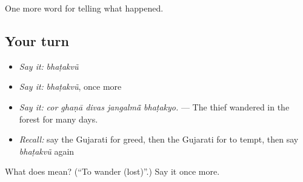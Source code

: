 \begin{grammarlens}[title={What you've built}]
One more word for telling what happened.
\end{grammarlens}

\subsection*{Your turn}
\begin{itemize}
\raggedright
  \item \emph{Say it:} \emph{bhaṭakvũ}
  \item \emph{Say it:} \emph{bhaṭakvũ}, once more
  \item \emph{Say it:} \emph{cor ghaṇā divas jangalmā̃ bhaṭakyo.} — The thief wandered in the forest for many days.
  \item \emph{Recall:} say the Gujarati for greed, then the Gujarati for to tempt, then say \emph{bhaṭakvũ} again
\end{itemize}

\begin{tcolorbox}[breakable,colback=teal!4,colframe=teal!35!black,title={Before you move on}]
What does  mean? (\textquotedblleft{}To wander (lost)\textquotedblright{}.) Say it once more.
\end{tcolorbox}
